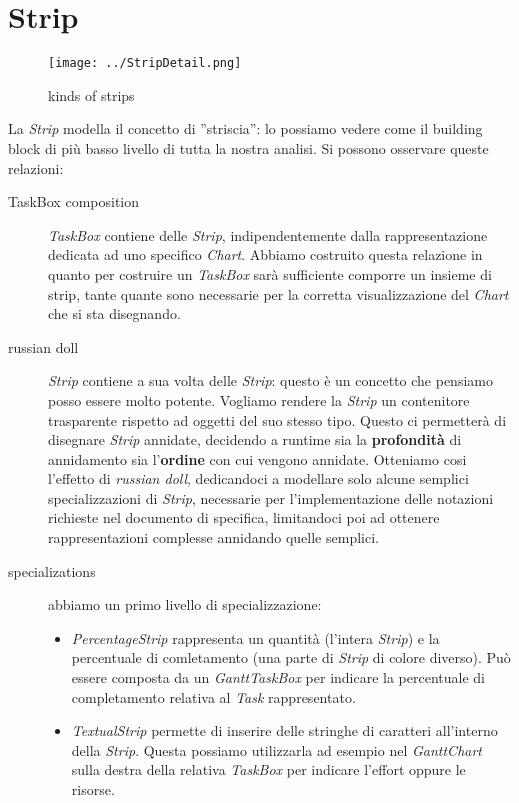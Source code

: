 \section{Strip}
\label{sec:strip}

\begin{figure}[h!] 
	\centering
	\texttt{[image: ../StripDetail.png]}
	\caption{kinds of strips}
	\label{fig:strip} 
\end{figure}

La \emph{Strip} modella il concetto di ''striscia'': lo possiamo vedere come il
building block di pi\`u basso livello di tutta la nostra analisi. Si possono
osservare queste relazioni:
\begin{description}
  \item[TaskBox composition] \emph{TaskBox} contiene delle \emph{Strip},
  indipendentemente dalla rappresentazione dedicata ad uno specifico \emph{Chart}. Abbiamo costruito
  questa relazione in quanto per costruire un \emph{TaskBox} sar\`a sufficiente
  comporre un insieme di strip, tante quante sono necessarie per la corretta
  visualizzazione del \emph{Chart} che si sta disegnando.
  \item[russian doll] \emph{Strip} contiene a sua volta delle \emph{Strip}:
  questo \`e un concetto che pensiamo posso essere molto potente. Vogliamo rendere la
  \emph{Strip} un contenitore trasparente rispetto ad oggetti del suo stesso
  tipo. Questo ci permetter\`a di disegnare \emph{Strip} annidate, decidendo a
  runtime sia la \textbf{profondit\`a} di annidamento sia l'\textbf{ordine} con
  cui vengono annidate. Otteniamo cosi l'effetto di \emph{russian doll}, 
  dedicandoci a modellare solo alcune semplici specializzazioni di \emph{Strip},
  necessarie per l'implementazione delle notazioni richieste nel documento di specifica,
  limitandoci poi ad ottenere rappresentazioni complesse annidando quelle
  semplici.
  \item[specializations] abbiamo un primo livello di specializzazione:
  \begin{itemize}
    \item \emph{PercentageStrip} rappresenta un quantit\`a (l'intera
    \emph{Strip}) e la percentuale di comletamento (una parte di \emph{Strip}
    di colore diverso). Pu\`o essere composta da un \emph{GanttTaskBox} per
    indicare la percentuale di completamento relativa al \emph{Task}
    rappresentato.
    
    \item \emph{TextualStrip} permette di inserire delle stringhe di caratteri
    all'interno della \emph{Strip}. Questa possiamo utilizzarla ad esempio nel
    \emph{GanttChart} sulla destra della relativa \emph{TaskBox} per indicare
    l'effort oppure le risorse.
    

\end{itemize}
\end{description}
